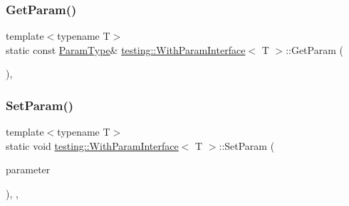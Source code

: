 \mbox{\label{classtesting_1_1_with_param_interface_a1078d4493d7aa4d3e50d1d6c661bee4d}} 
\subsubsection{\texorpdfstring{GetParam()}{GetParam()}\hspace{0.1cm}{\footnotesize\ttfamily [3/3]}}
{\footnotesize\ttfamily template$<$typename T$>$ \\
static const \mbox{\hyperlink{classtesting_1_1_with_param_interface_a343febaaebf1f025bda484f841d4fec1}{Param\+Type}}\& \mbox{\hyperlink{classtesting_1_1_with_param_interface}{testing\+::\+With\+Param\+Interface}}$<$ T $>$\+::Get\+Param (\begin{DoxyParamCaption}{ }\end{DoxyParamCaption})\hspace{0.3cm}{\ttfamily [inline]}, {\ttfamily [static]}}

\mbox{\label{classtesting_1_1_with_param_interface_a471e12a61e83347675b649465bc5aabc}} 
\subsubsection{\texorpdfstring{SetParam()}{SetParam()}\hspace{0.1cm}{\footnotesize\ttfamily [1/3]}}
{\footnotesize\ttfamily template$<$typename T$>$ \\
static void \mbox{\hyperlink{classtesting_1_1_with_param_interface}{testing\+::\+With\+Param\+Interface}}$<$ T $>$\+::Set\+Param (\begin{DoxyParamCaption}\item[{const \mbox{\hyperlink{classtesting_1_1_with_param_interface_a343febaaebf1f025bda484f841d4fec1}{Param\+Type}} $\ast$}]{parameter }\end{DoxyParamCaption})\hspace{0.3cm}{\ttfamily [inline]}, {\ttfamily [static]}, {\ttfamily [private]}}

